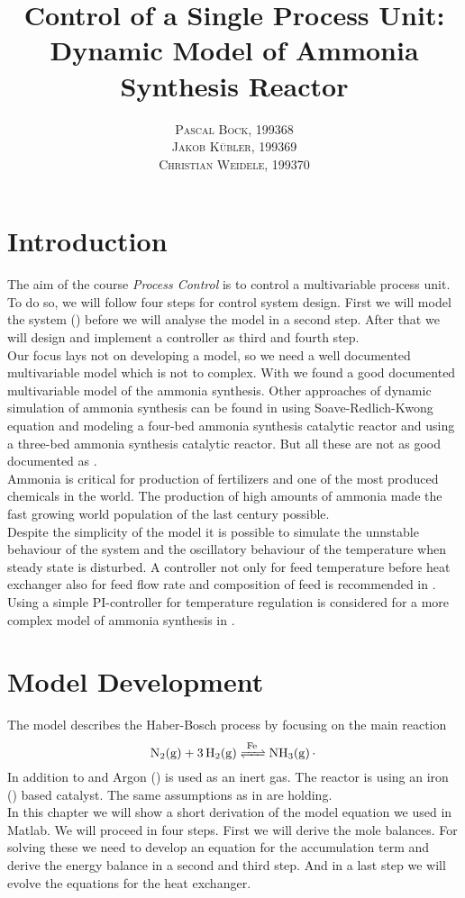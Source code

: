 \documentclass[paper=letter, fontsize=12pt]{article}
\title{\vspace{-15mm}\fontsize{24pt}{10pt}\selectfont\textbf{Control of a Single Process Unit: Dynamic Model of Ammonia Synthesis Reactor}} %
\author{
\large
{\textsc{Pascal Bock, 199368 }}\\[2mm]
{\textsc{Jakob Kübler, 199369 }}\\[2mm]
{\textsc{Christian Weidele, 199370 }}\\[2mm]
}
\date{}
\newcommand\reaction[1]{\begin{equation}\ce{#1}\end{equation}}
\begin{document}
\maketitle %
\thispagestyle{fancy} %


\section{Introduction}
The aim of the course \emph{Process Control} is to control a multivariable process unit. To do so, we will follow four steps for control system design. First we will model the system (\label{s:modelDevelopment}) before we will analyse the model in a second step. After that we will design and implement a controller as third and fourth step. \\
Our focus lays not on developing a model, so we need a well documented multivariable model which is not to complex. With \cite{Jinasena2016} we found a good documented multivariable model of the ammonia synthesis. Other approaches of dynamic simulation of ammonia synthesis can be found in \cite{Kasiri2003} using Soave-Redlich-Kwong equation and modeling a four-bed ammonia synthesis catalytic reactor and \cite{Mancusi2009} using a three-bed ammonia synthesis catalytic reactor. But all these are not as good documented as \cite{Jinasena2016}.\\
Ammonia is critical for production of fertilizers and one of the most produced chemicals in the world. The production of high amounts of ammonia made the fast growing world population of the last century possible. \cite{Pattabathula2016} \\
Despite the simplicity of the model it is possible to simulate the unnstable behaviour of the system and the oscillatory behaviour of the temperature when steady state is disturbed. A controller not only for feed temperature before heat exchanger also for feed flow rate and composition of feed is recommended in \cite{Jinasena2016}. Using a simple PI-controller for temperature regulation is considered for a more complex model of ammonia synthesis in \cite{Morud1998}.


\section{Model Development} \label{s:modelDevelopment}

The model describes the Haber-Bosch process by focusing on the main reaction
\reaction{N2(g) + 3H2(g) <=>[Fe] NH3(g).} \label{f:reaction}
In addition to  and  Argon () is used as an inert gas. The reactor is using an iron () based catalyst. The same assumptions as in \cite{Jinasena2016} are holding.\\
In this chapter we will show a short derivation of the model equation we used in Matlab. We will proceed in four steps. First we will derive the mole balances. For solving these we need to develop an equation for the accumulation term and derive the energy balance in a second and third step. And in a last step we will evolve the equations for the heat exchanger.
\end{document}
